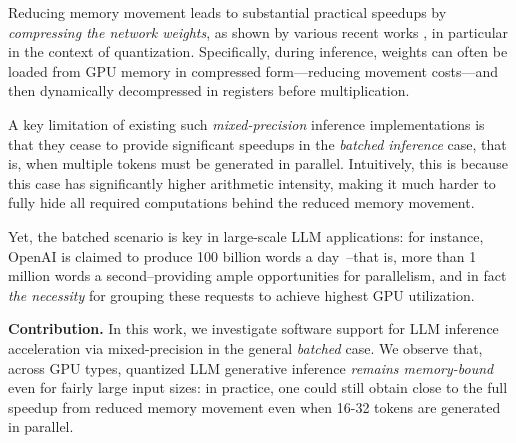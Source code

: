 \documentclass{article}
\theoremstyle{plain}
\theoremstyle{definition}
\theoremstyle{remark}
\newcommand{\htor}[1]{\textcolor{green}{[htor: #1]}}
\renewcommand{\paragraph}[1]{\vspace{0.1em}\noindent\textbf{#1}}
\begin{document}
Reducing memory movement leads to substantial practical speedups by \emph{compressing the network weights}, as shown by various recent works \cite{frantar2022gptq, lin2023awq, shao2023omniquant, dettmers2023spqr}, in particular in the context of quantization. Specifically, during inference, weights can often be loaded from GPU memory in compressed form---reducing movement costs---and then dynamically decompressed in registers before multiplication.


A key limitation of existing such \emph{mixed-precision} inference implementations is that they cease to provide significant speedups in the \emph{batched inference} case, that is, when multiple tokens must be generated in parallel.
Intuitively, this is because this case has significantly higher arithmetic intensity, making it much harder to fully hide all required computations behind the reduced memory movement.

Yet, the batched scenario is key in large-scale LLM applications: for instance, OpenAI is claimed to produce 100 billion words a day~\cite{SamA}--that is, more than 1 million words a second--providing ample opportunities for parallelism, and in fact \emph{the necessity} for grouping these requests to achieve highest GPU utilization. 

\paragraph{Contribution.} 
In this work, we investigate software support for LLM inference acceleration via mixed-precision in the general \emph{batched} case. 
We observe that, across GPU types, quantized LLM generative inference \emph{remains memory-bound} even for fairly large input sizes: in practice, one could still obtain close to the full speedup from reduced memory movement even when 16-32 tokens are generated in parallel.
\end{document}
